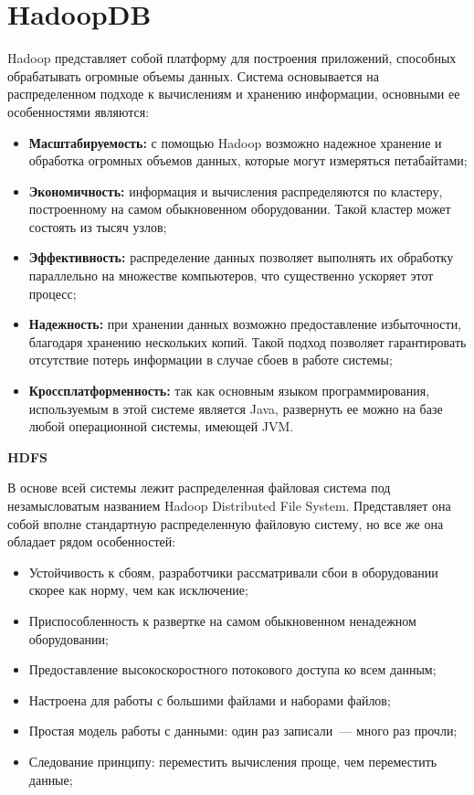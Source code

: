 \section{HadoopDB}
Hadoop  представляет собой платформу для построения приложений, способных обрабатывать огромные объемы данных. 
Система основывается на распределенном подходе к вычислениям и хранению информации, основными ее особенностями являются:
\begin{itemize}
\item \textbf{Масштабируемость:} с помощью Hadoop возможно надежное хранение и обработка огромных объемов данных, 
которые могут измеряться петабайтами;
\item \textbf{Экономичность:} информация и вычисления распределяются по кластеру, построенному на самом 
обыкновенном оборудовании. Такой кластер может состоять из тысяч узлов;
\item \textbf{Эффективность:} распределение данных позволяет выполнять их обработку параллельно на множестве компьютеров, 
что существенно ускоряет этот процесс;
\item \textbf{Надежность:} при хранении данных возможно предоставление избыточности, благодаря хранению нескольких копий. 
Такой подход позволяет гарантировать отсутствие потерь информации в случае сбоев в работе системы;
\item \textbf{Кроссплатформенность:} так как основным языком программирования, используемым в этой системе является Java, 
развернуть ее можно на базе любой операционной системы, имеющей JVM.
\end{itemize}

\textbf{HDFS}

В основе всей системы лежит распределенная файловая система под незамысловатым названием Hadoop 
Distributed File System. Представляет она собой вполне стандартную распределенную файловую систему, но все же 
она обладает рядом особенностей:
\begin{itemize}
\item Устойчивость к сбоям, разработчики рассматривали сбои в оборудовании скорее как норму, чем как исключение;
\item Приспособленность к развертке на самом обыкновенном ненадежном оборудовании;
\item Предоставление высокоскоростного потокового доступа ко всем данным;
\item Настроена для работы с большими файлами и наборами файлов;
\item Простая модель работы с данными: один раз записали~--- много раз прочли;
\item Следование принципу: переместить вычисления проще, чем переместить данные;
\end{itemize}

